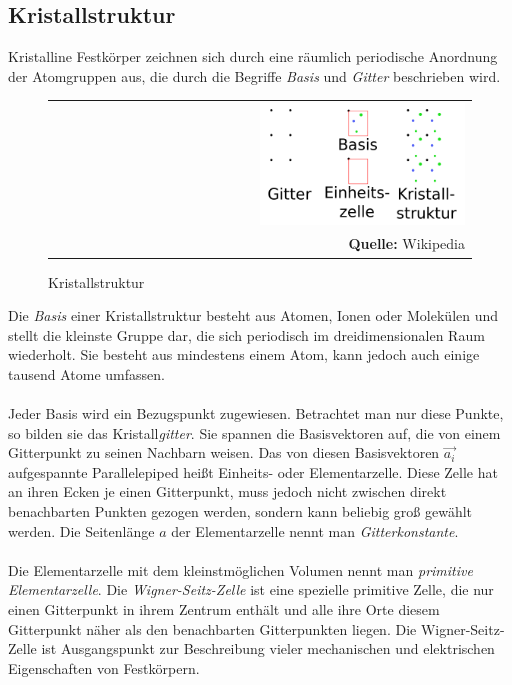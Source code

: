 \documentclass[a4paper,titlepage]{scrartcl}
\numberwithin{equation}{section}
\begin{document}
\subsection{Kristallstruktur}
Kristalline Festkörper zeichnen sich durch eine räumlich periodische Anordnung der Atomgruppen aus, die durch die Begriffe \emph{Basis} und \emph{Gitter} beschrieben wird.
\begin{figure}[H]
	\centering
	\begin{tabular}{@{}r@{}}
		\includegraphics[width=0.5\textwidth]{images/kristallstruktur.png}\\
		\footnotesize\sffamily\textbf{Quelle:} Wikipedia \cite{wiki:kristallstruktur}
	\end{tabular}
	\caption{Kristallstruktur}
    \label{fig:kristallstruktur}
\end{figure}
Die \emph{Basis} einer Kristallstruktur besteht aus Atomen, Ionen oder Molekülen und stellt die kleinste Gruppe dar, die sich periodisch im dreidimensionalen Raum wiederholt. Sie besteht aus mindestens einem Atom, kann jedoch auch einige tausend Atome umfassen.\\ \\
Jeder Basis wird ein Bezugspunkt zugewiesen. Betrachtet man nur diese Punkte, so bilden sie das Kristall\emph{gitter}. Sie spannen die Basisvektoren auf, die von einem Gitterpunkt zu seinen Nachbarn weisen. Das von diesen Basisvektoren $\vec{a_i}$ aufgespannte Parallelepiped heißt Einheits- oder Elementarzelle. Diese Zelle hat an ihren Ecken je einen Gitterpunkt, muss jedoch nicht zwischen direkt benachbarten Punkten gezogen werden, sondern kann beliebig groß gewählt werden. \cite{wiki:kristallstruktur} Die Seitenlänge $a$ der Elementarzelle nennt man \emph{Gitterkonstante}.\\ \\
Die Elementarzelle mit dem kleinstmöglichen Volumen nennt man \emph{primitive Elementarzelle}. Die \emph{Wigner-Seitz-Zelle} ist eine spezielle primitive Zelle, die nur einen Gitterpunkt in ihrem Zentrum enthält und alle ihre Orte diesem Gitterpunkt näher als den benachbarten Gitterpunkten liegen. Die Wigner-Seitz-Zelle ist Ausgangspunkt zur Beschreibung vieler mechanischen und elektrischen Eigenschaften von Festkörpern. \cite{wiki:wignerseitz}\\ \\
\end{document}
